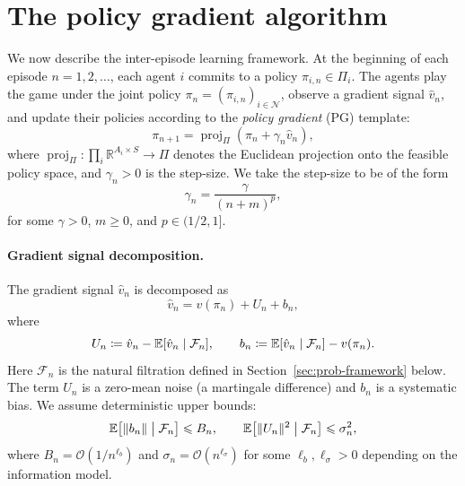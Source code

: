 \documentclass[a4paper,oneside,11pt]{report}
\newcommand{\R}{\mathbb{R}}
\newcommand{\calN}{\mathcal{N}}
\newcommand{\calF}{\mathcal{F}}
\newcommand{\norm}[1]{\| #1 \|}
\newcommand{\projPi}{\operatorname{proj}_\Pi}
\numberwithin{theorem}{chapter}
\numberwithin{equation}{chapter}
\begin{document}
\section{The policy gradient algorithm}
\label{sec:PG}

We now describe the inter-episode learning framework. At the beginning
of each episode $n = 1, 2, \ldots$, each agent $i$ commits to a policy
$\pi_{i,n} \in \Pi_i$. The agents play the game under the joint policy
$\pi_n = (\pi_{i,n})_{i \in \calN}$, observe a gradient signal
$\hat v_n$, and update their policies according to the \emph{policy
  gradient} (PG) template:
\begin{equation}
  \label{eq:PG}
  \pi_{n+1} = \projPi(\pi_n + \gamma_n \hat v_n),
  \tag{PG}
\end{equation}
where $\projPi \colon \prod_i \R^{A_i \times S} \to \Pi$ denotes the
Euclidean projection onto the feasible policy space, and
$\gamma_n > 0$ is the step-size. We take the step-size to be of the
form
\begin{equation}
  \label{eq:step-size}
  \gamma_n = \frac{\gamma}{(n+m)^p},
\end{equation}
for some $\gamma > 0$, $m \ge 0$, and $p \in (1/2, 1]$.

\paragraph{Gradient signal decomposition.}
The gradient signal $\hat v_n$ is decomposed as
\begin{equation}
  \label{eq:oracle-decomp}
  \hat v_n = v(\pi_n) + U_n + b_n,
\end{equation}
where
\begin{equation}
  \label{eq:U-b-def}
  U_n \coloneqq \hat v_n - \E[\hat v_n \mid \calF_n],
  \qquad
  b_n \coloneqq \E[\hat v_n \mid \calF_n] - v(\pi_n).
\end{equation}
Here $\calF_n$ is the natural filtration defined in
Section~\ref{sec:prob-framework} below. The term $U_n$ is a zero-mean
noise (a martingale difference) and $b_n$ is a systematic bias. We
assume deterministic upper bounds:
\begin{equation}
  \label{eq:bias-var-bounds}
  \E\bigl[\norm{b_n} \bigm| \calF_n\bigr] \le B_n,
  \qquad
  \E\bigl[\norm{U_n}^2 \bigm| \calF_n\bigr] \le \sigma_n^2,
\end{equation}
where $B_n = \mathcal{O}(1/n^{\ell_b})$ and
$\sigma_n = \mathcal{O}(n^{\ell_\sigma})$ for some
$\ell_b, \ell_\sigma > 0$ depending on the information model.
\end{document}
